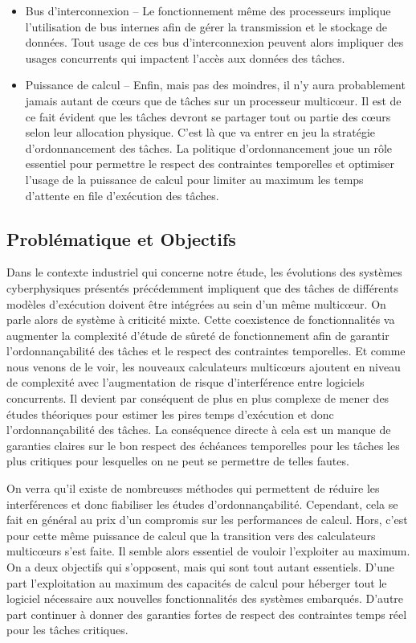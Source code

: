 \documentclass[french, a4paper, 11pt, twoside, pdftex]{StyleThese}
\begin{document}
\begin{itemize}
			\item Bus d'interconnexion -- 
				Le fonctionnement même des processeurs implique l'utilisation de bus internes afin de gérer la transmission et le stockage de données. Tout usage de ces bus d'interconnexion peuvent alors impliquer des usages concurrents qui impactent l'accès aux données des tâches.
			\item Puissance de calcul -- 
				Enfin, mais pas des moindres, il n'y aura probablement jamais autant de cœurs que de tâches sur un processeur multicœur. Il est de ce fait évident que les tâches devront se partager tout ou partie des cœurs selon leur allocation physique. C'est là que va entrer en jeu la stratégie d'ordonnancement des tâches. La politique d'ordonnancement joue un rôle essentiel pour permettre le respect des contraintes temporelles et optimiser l'usage de la puissance de calcul pour limiter au maximum les temps d'attente en file d'exécution des tâches. 
		\end{itemize}

\subsection{Problématique et Objectifs}
		Dans le contexte industriel qui concerne notre étude, les évolutions des systèmes cyberphysiques présentés précédemment impliquent que des tâches de différents modèles d'exécution doivent être intégrées au sein d'un même multicœur. On parle alors de système à criticité mixte. Cette coexistence de fonctionnalités va augmenter la complexité d'étude de sûreté de fonctionnement afin de garantir l'ordonnançabilité des tâches et le respect des contraintes temporelles. Et comme nous venons de le voir, les nouveaux calculateurs multicœurs ajoutent en niveau de complexité avec l'augmentation de risque d'interférence entre logiciels concurrents. Il devient par conséquent de plus en plus complexe de mener des études théoriques pour estimer les pires temps d'exécution et donc l'ordonnançabilité des tâches. La conséquence directe à cela est un manque de garanties claires sur le bon respect des échéances temporelles pour les tâches les plus critiques pour lesquelles on ne peut se permettre de telles fautes.
		
		On verra qu'il existe de nombreuses méthodes qui permettent de réduire les interférences et donc fiabiliser les études d'ordonnançabilité. Cependant, cela se fait en général au prix d'un compromis sur les performances de calcul.
		Hors, c'est pour cette même puissance de calcul que la transition vers des calculateurs multicœurs s'est faite. Il semble alors essentiel de vouloir l'exploiter au maximum. On a deux objectifs qui s'opposent, mais qui sont tout autant essentiels. D'une part l'exploitation au maximum des capacités de calcul pour héberger tout le logiciel nécessaire aux nouvelles fonctionnalités des systèmes embarqués. D'autre part continuer à donner des garanties fortes de respect des contraintes temps réel pour les tâches critiques. 
		
\end{document}
